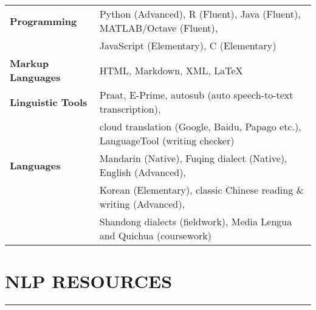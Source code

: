 \documentclass[a4paper, 11pt]{article}  %
\begin{document}
\begin{tabular}{@{} l l } %

 	\textbf{Programming}  & Python (Advanced), R (Fluent), Java (Fluent), MATLAB/Octave (Fluent), \\
	 	& JavaScript (Elementary), C (Elementary) \vspace{11pt} \\ 

 	\textbf{Markup Languages} & HTML, Markdown, XML, \LaTeX \vspace{11pt}  \\  
	
 	\textbf{Linguistic Tools} & Praat, E-Prime, autosub (auto speech-to-text transcription), \\
	 	& cloud translation (Google, Baidu, Papago etc.), LanguageTool (writing checker) \vspace{11pt} \\ 
	
	\textbf{Languages} & Mandarin (Native), Fuqing dialect (Native), English (Advanced), \\ 
	 	&  Korean (Elementary), classic Chinese reading \& writing (Advanced), \\
		& Shandong dialects (fieldwork), Media Lengua and Quichua (coursework)

\end{tabular}

\section*{NLP RESOURCES}
\hrule 
\vspace{11pt}
\end{document}
